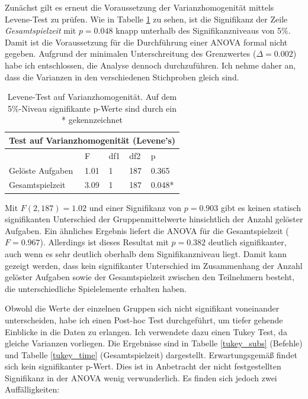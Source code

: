 Zunächst gilt es erneut die Voraussetzung der Varianzhomogenität mittels Levene-Test zu prüfen. Wie in Tabelle \ref{levene_amova} zu sehen, ist die Signifikanz der Zeile \textit{Gesamtspielzeit} mit $p=0.048$ knapp unterhalb des Signifikanzniveaus von 5\%. Damit ist die Voraussetzung für die Durchführung einer ANOVA formal nicht gegeben. Aufgrund der minimalen Unterschreitung des Grenzwertes ($\Delta=0.002$) habe ich entschlossen, die Analyse dennoch durchzuführen. Ich nehme daher an, dass die Varianzen in den verschiedenen Stichproben gleich sind.

\begin{table}[htbp]
\centering
\begin{tabular}{ |p{4cm}||p{2.0cm}|p{2.0cm}|p{2.0cm}|p{2.0cm}| }
 \hline
 \multicolumn{5}{|c|}{Test auf Varianzhomogenität (Levene's)} \\
 \hline
 & F & df1 &df2 &p \\
 \hline
  Gelöste Aufgaben      & 1.01     & 1 &   187 & 0.365\\
  Gesamtspielzeit       & 3.09     & 1 &   187 & 0.048*\\
 \hline
\end{tabular}
\caption{Levene-Test auf Varianzhomogenität. Auf dem 5\%-Niveau signifikante p-Werte sind durch ein * gekennzeichnet}
\label{levene_amova}
\end{table}

Mit $F(2,187) = 1.02$ und einer Signifikanz von $p=0.903$ gibt es keinen statisch signifikanten Unterschied der Gruppenmittelwerte hinsichtlich der Anzahl gelöster Aufgaben. Ein ähnliches Ergebnis liefert die ANOVA für die Gesamtspielzeit ($F=0.967$). Allerdings ist dieses Resultat mit $p=0.382$ deutlich signifikanter, auch wenn es sehr deutlich oberhalb dem Signifikanzniveau liegt. Damit kann gezeigt werden, dass kein signifikanter Unterschied im Zusammenhang der Anzahl gelöster Aufgaben sowie der Gesamtspielzeit zwischen den Teilnehmern besteht, die unterschiedliche Spielelemente erhalten haben.

Obwohl die Werte der einzelnen Gruppen sich nicht signifikant voneinander unterscheiden, habe ich einen Post-hoc Test durchgeführt, um tiefer gehende Einblicke in die Daten zu erlangen. Ich verwendete dazu einen Tukey Test, da gleiche Varianzen vorliegen. Die Ergebnisse sind in Tabelle \ref{tukey_subs} (Befehle) und Tabelle \ref{tukey_time} (Gesamtspielzeit) dargestellt. Erwartungsgemäß findet sich kein signifikanter p-Wert. Dies ist in Anbetracht der nicht festgestellten Signifikanz in der ANOVA wenig verwunderlich. Es finden sich jedoch zwei Auffälligkeiten: 

